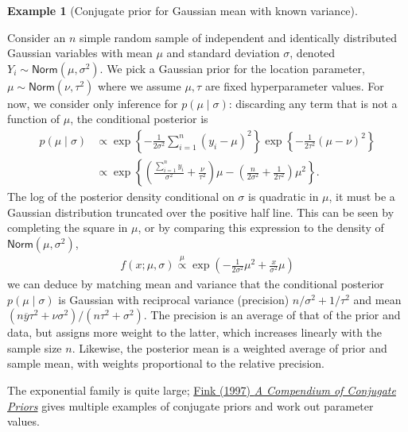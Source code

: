 \documentclass[
  11pt,
  letterpaper,
]{scrbook}
\theoremstyle{definition}
\newtheorem{example}{Example}[chapter]
\theoremstyle{definition}
\theoremstyle{definition}
\theoremstyle{plain}
\theoremstyle{remark}
\begin{document}
\begin{example}[Conjugate prior for Gaussian mean with known
variance]\protect\hypertarget{exm-conjugatepriors-normal}{}\label{exm-conjugatepriors-normal}

Consider an \(n\) simple random sample of independent and identically
distributed Gaussian variables with mean \(\mu\) and standard deviation
\(\sigma\), denoted \(Y_i \sim \mathsf{Norm}(\mu, \sigma^2)\). We pick a
Gaussian prior for the location parameter,
\(\mu \sim \mathsf{Norm}(\nu, \tau^2)\) where we assume \(\mu, \tau\)
are fixed hyperparameter values. For now, we consider only inference for
\(p(\mu \mid \sigma)\): discarding any term that is not a function of
\(\mu\), the conditional posterior is \begin{align*}
p(\mu \mid \sigma) &\propto \exp\left\{ -\frac{1}{2\sigma^2}\sum_{i=1}^n (y_{i}-\mu)^2\right\} \exp\left\{-\frac{1}{2\tau^2}(\mu - \nu)^2\right\}
\\&\propto \exp\left\{\left(\frac{\sum_{i=1}^n y_{i}}{\sigma^2} + \frac{\nu}{\tau^2}\right)\mu - \left( \frac{n}{2\sigma^2} +\frac{1}{2\tau^2}\right)\mu^2\right\}.
\end{align*} The log of the posterior density conditional on \(\sigma\)
is quadratic in \(\mu\), it must be a Gaussian distribution truncated
over the positive half line. This can be seen by completing the square
in \(\mu\), or by comparing this expression to the density of
\(\mathsf{Norm}(\mu, \sigma^2)\), \begin{align*}
f(x; \mu, \sigma) \stackrel{\mu}{\propto} \exp\left(-\frac{1}{2 \sigma^2}\mu^2 + \frac{x}{\sigma^2}\mu\right)
\end{align*} we can deduce by matching mean and variance that the
conditional posterior \(p(\mu \mid \sigma)\) is Gaussian with reciprocal
variance (precision) \(n/\sigma^2 + 1/\tau^2\) and mean
\((n\overline{y}\tau^2 + \nu \sigma^2)/(n\tau^2 + \sigma^2)\). The
precision is an average of that of the prior and data, but assigns more
weight to the latter, which increases linearly with the sample size
\(n\). Likewise, the posterior mean is a weighted average of prior and
sample mean, with weights proportional to the relative precision.

\end{example}

The exponential family is quite large;
\href{https://citeseerx.ist.psu.edu/doc/10.1.1.157.5540}{Fink (1997)
\emph{A Compendium of Conjugate Priors}} gives multiple examples of
conjugate priors and work out parameter values.
\end{document}
